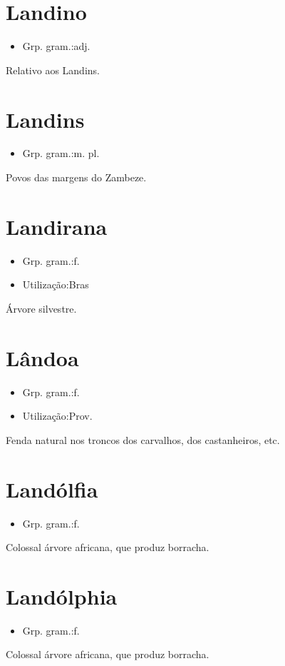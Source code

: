 \section{Landino}
\begin{itemize}
\item {Grp. gram.:adj.}
\end{itemize}
Relativo aos Landins.
\section{Landins}
\begin{itemize}
\item {Grp. gram.:m. pl.}
\end{itemize}
Povos das margens do Zambeze.
\section{Landirana}
\begin{itemize}
\item {Grp. gram.:f.}
\end{itemize}
\begin{itemize}
\item {Utilização:Bras}
\end{itemize}
Árvore silvestre.
\section{Lândoa}
\begin{itemize}
\item {Grp. gram.:f.}
\end{itemize}
\begin{itemize}
\item {Utilização:Prov.}
\end{itemize}
Fenda natural nos troncos dos carvalhos, dos castanheiros, etc.
\section{Landólfia}
\begin{itemize}
\item {Grp. gram.:f.}
\end{itemize}
Colossal árvore africana, que produz borracha.
\section{Landólphia}
\begin{itemize}
\item {Grp. gram.:f.}
\end{itemize}
Colossal árvore africana, que produz borracha.
